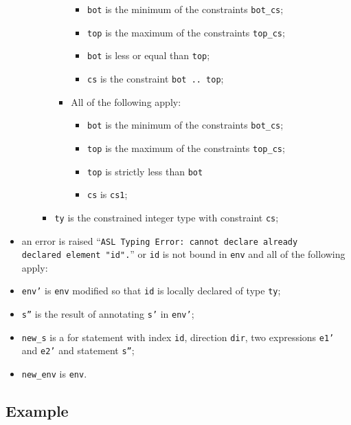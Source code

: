 \documentclass{book}
\begin{document}
\begin{itemize}
\begin{itemize}
\begin{itemize}
\begin{itemize}
                 \begin{itemize}
                   \item \texttt{bot} is the minimum of the constraints \texttt{bot\_cs};
                   \item \texttt{top} is the maximum of the constraints \texttt{top\_cs};
                   \item \texttt{bot} is less or equal than \texttt{top};
                   \item \texttt{cs} is the constraint \texttt{bot .. top};
                 \end{itemize}
               \item All of the following apply:
                 \begin{itemize}
                   \item \texttt{bot} is the minimum of the constraints \texttt{bot\_cs};
                   \item \texttt{top} is the maximum of the constraints \texttt{top\_cs};
                   \item \texttt{top} is strictly less than \texttt{bot}
                   \item \texttt{cs} is \texttt{cs1};
                 \end{itemize}
             \end{itemize}
           \item \texttt{ty} is the constrained integer type with constraint \texttt{cs};
         \end{itemize}
     \end{itemize}
   \item an error is raised ``\texttt{ASL Typing Error: cannot declare already \\ declared element "id".}'' or \texttt{id} is not bound in \texttt{env} and all of the following apply:
   \item \texttt{env'} is \texttt{env} modified so that \texttt{id} is locally declared of type \texttt{ty};
   \item \texttt{s''} is the result of annotating \texttt{s'} in \texttt{env'};
   \item \texttt{new\_s} is a for statement with index \texttt{id}, direction \texttt{dir}, two expressions \texttt{e1'} and \texttt{e2'} and statement \texttt{s''};
   \item \texttt{new\_env} is \texttt{env}.
   \end{itemize}

  \subsection{Example}
\end{document}
